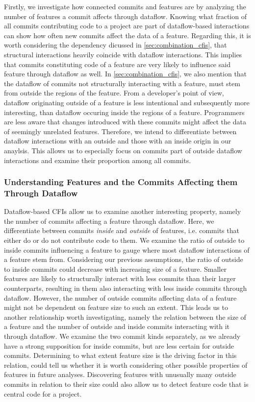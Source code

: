 Firstly, we investigate how connected commits and features are by analyzing the number of features a commit affects through dataflow.
Knowing what fraction of all commits contributing code to a project are part of dataflow-based interactions can show how often new commits affect the data of a feature. 
Regarding this, it is worth considering the dependency dicussed in \autoref{sec:combination_cfis}, that structural interactions heavily coincide with dataflow interactions.
This implies that commits constituting code of a feature are very likely to influence said feature through dataflow as well.
In \autoref{sec:combination_cfis}, we also mention that the dataflow of commits not structurally interacting with a feature, must stem from outside the regions of the feature. 
From a developer's point of view, dataflow originating outside of a feature is less intentional and subsequently more interesting, than dataflow occuring inside the regions of a feature. 
Programmers are less aware that changes introduced with these commits might affect the data of seemingly unrelated features.
Therefore, we intend to differentiate between dataflow interactions with an outside and those with an inside origin in our anaylsis.
This allows us to especially focus on commits part of outside dataflow interactions and examine their proportion among all commits. 

\subsubsection*{Understanding Features and the Commits Affecting them Through Dataflow}

Dataflow-based CFIs allow us to examine another interesting property, namely the number of commits affecting a feature through dataflow.
Here, we differentiate between commits \emph{inside} and \emph{outside} of features, i.e. commits that either do or do not contribute code to them.
We examine the ratio of outside to inside commits influencing a feature to gauge where most dataflow interactions of a feature stem from.
Considering our previous assumptions, the ratio of outside to inside commits could decrease with increasing size of a feature.
Smaller features are likely to structurally interact with less commits than their larger counterparts, resulting in them also interacting with less inside commits through dataflow.
However, the number of outside commits affecting data of a feature might not be dependent on feature size to such an extent.
This leads us to another relationship worth investigating, namely the relation between the size of a feature and the number of outside and inside commits interacting with it through dataflow.
We examine the two commit kinds separately, as we already have a strong supposition for inside commits, but are less certain for outside commits. 
Determining to what extent feature size is the driving factor in this relation, could tell us whether it is worth considering other possible properties of features in future analyses.
Discovering features with unusually many outside commits in relation to their size could also allow us to detect feature code that is central code for a project.


